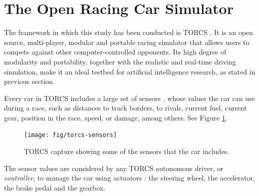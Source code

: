 \documentclass[10pt,journal,compsoc]{IEEEtran}
\begin{document}

\section{The Open Racing Car Simulator}
\label{sec:torcs}

The framework in which this study has been conducted is TORCS \cite{torcs4}. It is an open source, multi-player, modular and portable racing simulator that allows users to compete against other computer-controlled opponents.
Its high degree of modularity and portability, together with the
realistic and real-time driving simulation, make it an ideal testbed
for artificial intelligence research, as stated in previous section.

Every car in TORCS includes  a large set of sensors \cite{manualTORCS},
whose values the car can use during a race, such as distances to track borders, to rivals, current fuel, current gear, position in the race, speed, or damage, among others. See Figure \ref{fig:torcs-sensors}.

\begin{figure}[!ht] 
	\begin{center}
		\texttt{[image: fig/torcs-sensors]}
		\caption {TORCS capture showing some of the sensors that the car includes.}
		\label{fig:torcs-sensors}
	\end{center}
\end{figure}


The sensor values are considered by any TORCS autonomous driver, or
{\em controller}, to manage the car using actuators \cite{manualTORCS}: the
steering wheel, the accelerator, the brake pedal and the gearbox.   
\end{document}
